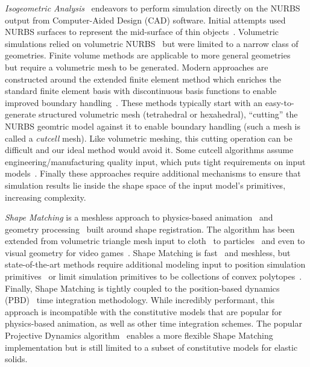 \emph{Isogeometric Analysis}~\cite{10.1002/9780470749081.ch7} endeavors to perform simulation directly on the NURBS output from 
Computer-Aided Design (CAD) software. Initial attempts used NURBS surfaces to represent the mid-surface of thin objects~\cite{10.1145/176579.176580}.
Volumetric simulations relied on volumetric NURBS~\cite{10.1007/978-3-642-03596-8_2} but were limited to a narrow class of geometries.
Finite volume methods are applicable to more general geometries~\cite{HEINRICH20121645,10.1002/nme.2311} but require a volumetric mesh to be generated.
Modern approaches are constructed around the extended finite element method which enriches the standard finite element basis with discontinuous basis functions
to enable improved boundary handling~\cite{https://doi.org/10.1002/nme.3120,10.1007/s00466-013-0854-7,https://doi.org/10.1002/nme.4852,SAFDARI2016373,10.1145/3355089.3356576}. 
These methods typically start with an easy-to-generate structured volumetric mesh (tetrahedral or hexahedral), ``cutting'' the NURBS geomtric model against
it to enable boundary handling (such a mesh is called a \emph{cutcell} mesh). 
Like volumetric meshing, this cutting operation can be difficult and our ideal method would avoid it. 
Some cutcell algorithms assume engineering/manufacturing quality input, which puts tight requirements on input models~\cite{10.1145/3355089.3356576}.
Finally these approaches require additional mechanisms to ensure that simulation results lie inside the shape space of the input model's primitives,
increasing complexity. 

\emph{Shape Matching} is a meshless approach to physics-based animation~\cite{10.1145/1073204.1073216,10.1145/2019406.2019438} and geometry processing~\cite{10.1111/j.1467-8659.2012.03171.x}
built around shape registration. The algorithm has been extended from volumetric triangle mesh input to cloth~\cite{10.2312/PE/vriphys/vriphys08/039-046} to particles~\cite{10.1145/1964921.1964987}
and even to visual geometry for video games~\cite{10.1145/2994258.2994260}. 
Shape Matching is fast~\cite{10.1145/1275808.1276480,10.5555/1632592.1632606} and meshless, but state-of-the-art methods require 
additional modeling input to position simulation primitives~\cite{10.1145/1964921.1964987} or limit simulation primitives to be 
collections of convex polytopes~\cite{10.1145/2994258.2994260}.
Finally, Shape Matching is tightly coupled to the position-based dynamics (PBD)~\cite{muller2007position}
time integration methodology. 
While incredibly performant, this approach is incompatible with the constitutive models that are popular for physics-based animation, as well as 
other time integration schemes. 
The popular Projective Dynamics algorithm~\cite{10.1145/2601097.2601116} enables a more flexible Shape Matching implementation but is still limited to a subset of
constitutive models for elastic solids. 

